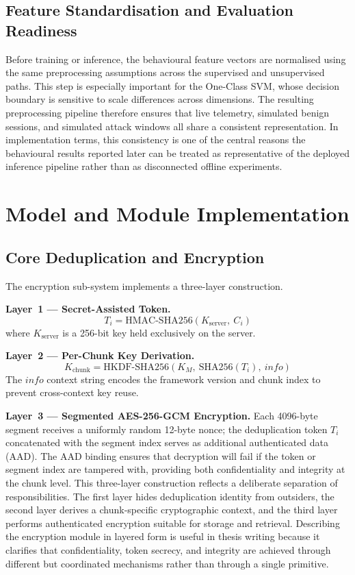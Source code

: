 \documentclass[12pt,a4paper,oneside]{report}
\newcommand{\KS}{K_{\mathrm{server}}}
\newcommand{\KM}{K_M}
\newcommand{\Kchunk}{K_{\mathrm{chunk}}}
\newcommand{\HMAC}{\mathrm{HMAC\text{-}SHA256}}
\newcommand{\HKDF}{\mathrm{HKDF\text{-}SHA256}}
\begin{document}
\subsection{Feature Standardisation and Evaluation Readiness}

Before training or inference, the behavioural feature vectors are normalised using the same preprocessing assumptions across the supervised and unsupervised paths. This step is especially important for the One-Class SVM, whose decision boundary is sensitive to scale differences across dimensions. The resulting preprocessing pipeline therefore ensures that live telemetry, simulated benign sessions, and simulated attack windows all share a consistent representation. In implementation terms, this consistency is one of the central reasons the behavioural results reported later can be treated as representative of the deployed inference pipeline rather than as disconnected offline experiments.

\section{Model and Module Implementation}

\subsection{Core Deduplication and Encryption}

The encryption sub-system implements a three-layer construction.

\textbf{Layer~1 — Secret-Assisted Token.}
\begin{equation}
  T_i = \HMAC\!\left(\KS,\ C_i\right)
  \label{eq:tok2}
\end{equation}
where $\KS$ is a 256-bit key held exclusively on the server.

\textbf{Layer~2 — Per-Chunk Key Derivation.}
\begin{equation}
  \Kchunk = \HKDF\!\left(\KM,\ \mathrm{SHA256}(T_i),\ \mathit{info}\right)
  \label{eq:kchunk}
\end{equation}
The $\mathit{info}$ context string encodes the framework version and chunk index to prevent cross-context key reuse.

\textbf{Layer~3 — Segmented AES-256-GCM Encryption.}
Each 4096-byte segment receives a uniformly random 12-byte nonce; the deduplication token $T_i$ concatenated with the segment index serves as additional authenticated data (AAD).
The AAD binding ensures that decryption will fail if the token or segment index are tampered with, providing both confidentiality and integrity at the chunk level.
This three-layer construction reflects a deliberate separation of responsibilities.
The first layer hides deduplication identity from outsiders, the second layer derives a chunk-specific cryptographic context, and the third layer performs authenticated encryption suitable for storage and retrieval.
Describing the encryption module in layered form is useful in thesis writing because it clarifies that confidentiality, token secrecy, and integrity are achieved through different but coordinated mechanisms rather than through a single primitive.
\end{document}
